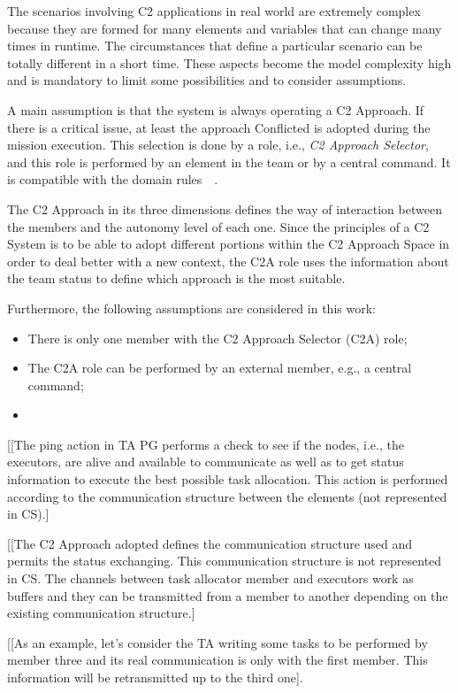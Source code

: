 The scenarios involving C2 applications in real world are extremely complex because they are formed for many elements and variables that can change many times in runtime. The circumstances that define a particular scenario can be totally different in a short time. These aspects become the model complexity high and is mandatory to limit some possibilities and to consider assumptions.

A main assumption is that the system is always operating a C2 Approach. If there is a critical issue, at least the approach Conflicted is adopted during the mission execution. This selection is done by a role, i.e., \textit{C2 Approach Selector}, and this role is performed by an element in the team or by a central command. It is compatible with the domain rules~\cite{nato01}~\cite{FRANCE2014}.

The C2 Approach in its three dimensions defines the way of interaction between the members and the autonomy level of each one. Since the principles of a C2 System is to be able to adopt different portions within the C2 Approach Space in order to deal better with a new context, the C2A role uses the information about the team status to define which approach is the most suitable.

Furthermore, the following assumptions are considered in this work:

\begin{itemize}
    \item There is only one member with the C2 Approach Selector (C2A) role;
    \item The C2A role can be performed by an external member, e.g., a central command;
    \item 
\end{itemize}
[[The ping action in TA PG performs a check to see if the nodes, i.e., the executors, are alive and available to communicate as well as to get status information to execute the best possible task allocation. This action is performed according to the communication structure between the elements (not represented in CS).]

[[The C2 Approach adopted defines the communication structure used and permits the status exchanging. This communication structure is not represented in CS. The channels between task allocator member and executors work as buffers and they can be transmitted from a member to another depending on the existing communication structure.]

[[As an example, let's consider the TA writing some tasks to be performed by member three and its real communication is only with the first member. This information will be retransmitted up to the third one].